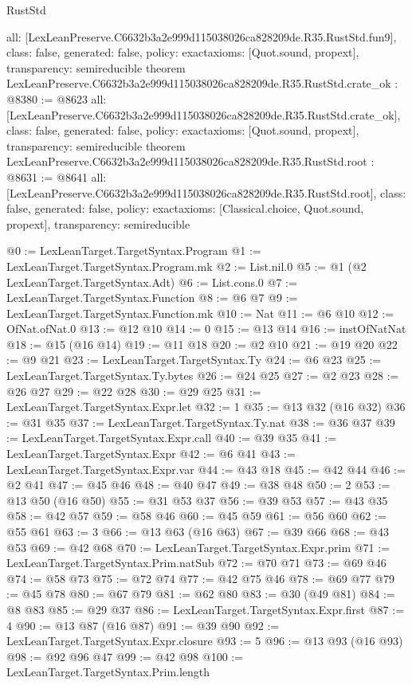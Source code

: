 \begin{lexlean}{RustStd}
\begin{coremodule}
{  all: [LexLeanPreserve.C6632b3a2e999d115038026ca828209de.R35.RustStd.fun9],
  class: false,
  generated: false,
  policy: exact{axioms: [Quot.sound, propext]},
  transparency: semireducible
}
theorem LexLeanPreserve.C6632b3a2e999d115038026ca828209de.R35.RustStd.crate_ok : @8380 := @8623 {
  all: [LexLeanPreserve.C6632b3a2e999d115038026ca828209de.R35.RustStd.crate_ok],
  class: false,
  generated: false,
  policy: exact{axioms: [Quot.sound, propext]},
  transparency: semireducible
}
theorem LexLeanPreserve.C6632b3a2e999d115038026ca828209de.R35.RustStd.root : @8631 := @8641 {
  all: [LexLeanPreserve.C6632b3a2e999d115038026ca828209de.R35.RustStd.root],
  class: false,
  generated: false,
  policy: exact{axioms: [Classical.choice, Quot.sound, propext]},
  transparency: semireducible
}

@0 := LexLeanTarget.TargetSyntax.Program
@1 := LexLeanTarget.TargetSyntax.Program.mk
@2 := List.nil.{0}
@5 := @1 (@2 LexLeanTarget.TargetSyntax.Adt)
@6 := List.cons.{0}
@7 := LexLeanTarget.TargetSyntax.Function
@8 := @6 @7
@9 := LexLeanTarget.TargetSyntax.Function.mk
@10 := Nat
@11 := @6 @10
@12 := OfNat.ofNat.{0}
@13 := @12 @10
@14 := 0
@15 := @13 @14
@16 := instOfNatNat
@18 := @15 (@16 @14)
@19 := @11 @18
@20 := @2 @10
@21 := @19 @20
@22 := @9 @21
@23 := LexLeanTarget.TargetSyntax.Ty
@24 := @6 @23
@25 := LexLeanTarget.TargetSyntax.Ty.bytes
@26 := @24 @25
@27 := @2 @23
@28 := @26 @27
@29 := @22 @28
@30 := @29 @25
@31 := LexLeanTarget.TargetSyntax.Expr.let
@32 := 1
@35 := @13 @32 (@16 @32)
@36 := @31 @35
@37 := LexLeanTarget.TargetSyntax.Ty.nat
@38 := @36 @37
@39 := LexLeanTarget.TargetSyntax.Expr.call
@40 := @39 @35
@41 := LexLeanTarget.TargetSyntax.Expr
@42 := @6 @41
@43 := LexLeanTarget.TargetSyntax.Expr.var
@44 := @43 @18
@45 := @42 @44
@46 := @2 @41
@47 := @45 @46
@48 := @40 @47
@49 := @38 @48
@50 := 2
@53 := @13 @50 (@16 @50)
@55 := @31 @53 @37
@56 := @39 @53
@57 := @43 @35
@58 := @42 @57
@59 := @58 @46
@60 := @45 @59
@61 := @56 @60
@62 := @55 @61
@63 := 3
@66 := @13 @63 (@16 @63)
@67 := @39 @66
@68 := @43 @53
@69 := @42 @68
@70 := LexLeanTarget.TargetSyntax.Expr.prim
@71 := LexLeanTarget.TargetSyntax.Prim.natSub
@72 := @70 @71
@73 := @69 @46
@74 := @58 @73
@75 := @72 @74
@77 := @42 @75 @46
@78 := @69 @77
@79 := @45 @78
@80 := @67 @79
@81 := @62 @80
@83 := @30 (@49 @81)
@84 := @8 @83
@85 := @29 @37
@86 := LexLeanTarget.TargetSyntax.Expr.first
@87 := 4
@90 := @13 @87 (@16 @87)
@91 := @39 @90
@92 := LexLeanTarget.TargetSyntax.Expr.closure
@93 := 5
@96 := @13 @93 (@16 @93)
@98 := @92 @96 @47
@99 := @42 @98
@100 := LexLeanTarget.TargetSyntax.Prim.length

\end{coremodule}
\end{lexlean}
